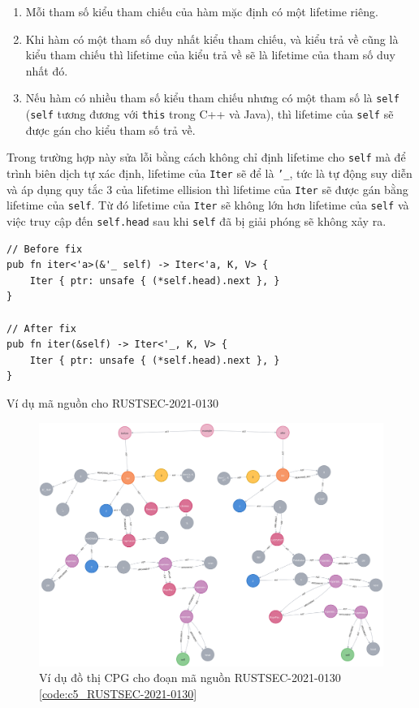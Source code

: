 \begin{enumerate}
    \item Mỗi tham số kiểu tham chiếu của hàm mặc định có một lifetime riêng.
    \item Khi hàm có một tham số duy nhất kiểu tham chiếu, và kiểu trả về cũng là kiểu tham chiếu thì lifetime của kiểu trả về sẽ là lifetime của tham số duy nhất đó.
    \item Nếu hàm có nhiều tham số kiểu tham chiếu nhưng có một tham số là \texttt{self} (\texttt{self} tương đương với \texttt{this} trong C++ và Java), thì lifetime của \texttt{self} sẽ được gán cho kiểu tham số trả về.
\end{enumerate}

Trong trường hợp này sửa lỗi bằng cách không chỉ định lifetime cho \texttt{self} mà để trình biên dịch tự xác định, lifetime của \texttt{Iter} sẽ để là \texttt{'\_}, tức là tự động suy diễn và áp dụng quy tắc 3 của lifetime ellision thì lifetime của \texttt{Iter} sẽ được gán bằng lifetime của \texttt{self}.
Từ đó lifetime của \texttt{Iter} sẽ không lớn hơn lifetime của \texttt{self} và việc truy cập đến \texttt{self.head} sau khi \texttt{self} đã bị giải phóng sẽ không xảy ra.

\begin{listing}[H]
\begin{verbatim}
// Before fix
pub fn iter<'a>(&'_ self) -> Iter<'a, K, V> {
    Iter { ptr: unsafe { (*self.head).next }, }
}

// After fix
pub fn iter(&self) -> Iter<'_, K, V> {
    Iter { ptr: unsafe { (*self.head).next }, }
}
\end{verbatim}
\caption{Ví dụ mã nguồn cho RUSTSEC-2021-0130}
\label{code:c5_RUSTSEC-2021-0130}
\end{listing}

\begin{figure}[H]
    \includegraphics[width=1\columnwidth]{figures/c5/c5_RUSTSEC-2021-0130.png}
    \centering
    \caption{Ví dụ đồ thị CPG cho đoạn mã nguồn RUSTSEC-2021-0130 \ref{code:c5_RUSTSEC-2021-0130}}
    \label{img:c5_RUSTSEC-2021-0130}
\end{figure}

